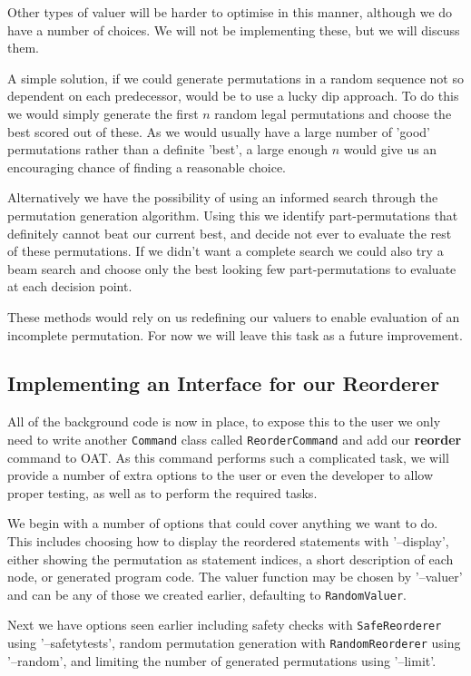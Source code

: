 \documentclass[twoside,a4paper]{report}
\begin{document}
Other types of valuer will be harder to optimise in this manner, although we do have a number of choices. We will not be implementing these, but we will
discuss them.

A simple solution, if we could generate permutations in a random sequence not so dependent on each predecessor, would be to use a lucky dip approach. To do
this we would simply generate the first $n$ random legal permutations and choose the best scored out of these. As we would usually have a large number of
'good' permutations rather than a definite 'best', a large enough $n$ would give us an encouraging chance of finding a reasonable choice.

Alternatively we have the possibility of using an informed search through the permutation generation algorithm. Using this we identify part-permutations that
definitely cannot beat our current best, and decide not ever to evaluate the rest of these permutations. If we didn't want a complete search we could also
try a beam search and choose only the best looking few part-permutations to evaluate at each decision point.

These methods would rely on us redefining our valuers to enable evaluation of an incomplete permutation. For now we will leave this task as a future improvement.

\subsection{Implementing an Interface for our Reorderer}

All of the background code is now in place, to expose this to the user we only need to write another \texttt{Command} class called \texttt{ReorderCommand} and
add our \textbf{reorder} command to OAT. As this command performs such a complicated task, we will provide a number of extra options to the user or even the
developer to allow proper testing, as well as to perform the required tasks.

We begin with a number of options that could cover anything we want to do. This includes choosing how to display the reordered statements with '--display',
either showing the permutation as statement indices, a short description of each node, or generated program code. The valuer function may be chosen by
'--valuer' and can be any of those we created earlier, defaulting to \texttt{RandomValuer}.

Next we have options seen earlier including safety checks with \texttt{SafeReorderer} using '--safetytests', random permutation generation with
\texttt{RandomReorderer} using '--random',  and limiting the number of generated permutations using '--limit'.
\end{document}
